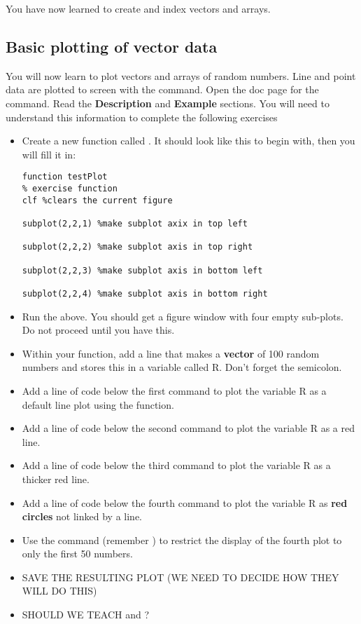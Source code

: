 \documentclass{article}
\begin{document}
You have now learned to create and index vectors and arrays. 

\pagebreak
\subsection*{Basic plotting of vector data}
You will now learn to plot vectors and arrays of random numbers. Line and point data are plotted to screen
with the  command. Open the doc page for the  command. Read the \textbf{Description} and
\textbf{Example} sections. You will need to understand this information to complete the following exercises

\begin{itemize}
\item Create a new function called . It should look like this to begin with, then you will fill it in:
\begin{lstlisting}
function testPlot
% exercise function
clf %clears the current figure

subplot(2,2,1) %make subplot axix in top left

subplot(2,2,2) %make subplot axis in top right

subplot(2,2,3) %make subplot axis in bottom left

subplot(2,2,4) %make subplot axis in bottom right

\end{lstlisting}

\item Run the above. You should get a figure window with four empty sub-plots. Do not proceed until you have this.

\item Within your function, add a line that makes a \textbf{vector} of 100 random numbers and stores this in a variable called R.
Don't forget the semicolon.
\item Add a line of code below the first  command to plot the variable R as a default line plot using the  function.
\item Add a line of code below the second  command to plot the variable R as a red line.
\item Add a line of code below the third  command to plot the variable R as a thicker red line.
\item Add a line of code below the fourth  command to plot the variable R as \textbf{red circles} not linked by a line.
\item Use the  command (remember ) to restrict the display of the fourth plot to only the first 50 numbers. 
\item SAVE THE RESULTING PLOT (WE NEED TO DECIDE HOW THEY WILL DO THIS)
\item SHOULD WE TEACH  and ?
\end{itemize}
\end{document}
